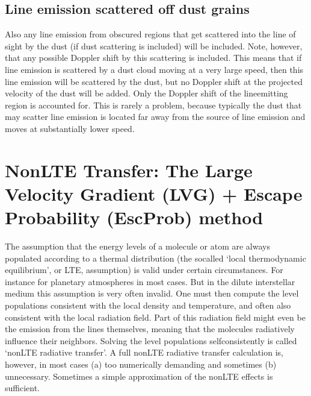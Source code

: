 \documentclass[letterpaper,10pt,english]{sphinxmanual}
\begin{document}
\subsection{Line emission scattered off dust grains}
\label{\detokenize{lineradtrans:line-emission-scattered-off-dust-grains}}\label{\detokenize{lineradtrans:sec-line-scat-off-dust}}

Also any line emission from obscured regions that get scattered into the
line of sight by the dust (if dust scattering is included) will be
included. Note, however, that any possible Doppler shift  by
this scattering is  included. This means that if line emission is
scattered by a dust cloud moving at a very large speed, then this line
emission will be scattered by the dust, but no Doppler shift at the
projected velocity of the dust will be added. Only the Doppler shift of the
line\sphinxhyphen{}emitting region is accounted for. This is rarely a problem, because
typically the dust that may scatter line emission is located far away from
the source of line emission and moves at substantially lower speed.


\section{Non\sphinxhyphen{}LTE Transfer: The Large Velocity Gradient (LVG) + Escape Probability (EscProb) method}
\label{\detokenize{lineradtrans:non-lte-transfer-the-large-velocity-gradient-lvg-escape-probability-escprob-method}}\label{\detokenize{lineradtrans:sec-lvg}}
The assumption that the energy levels of a molecule or atom are always
populated according to a thermal distribution (the so\sphinxhyphen{}called ‘local
thermodynamic equilibrium’, or LTE, assumption) is valid under certain
circumstances. For instance for planetary atmospheres in most cases.  But in
the dilute interstellar medium this assumption is very often invalid.  One
must then compute the level populations consistent with the local density
and temperature, and often also consistent with the local radiation
field. Part of this radiation field might even be the emission from the
lines themselves, meaning that the molecules radiatively influence their
neighbors. Solving the level populations self\sphinxhyphen{}consistently is called
‘non\sphinxhyphen{}LTE radiative transfer’. A full non\sphinxhyphen{}LTE radiative transfer
calculation is, however, in most cases (a) too numerically demanding and
sometimes (b) unnecessary. Sometimes a simple approximation of the non\sphinxhyphen{}LTE
effects is sufficient.
\end{document}
